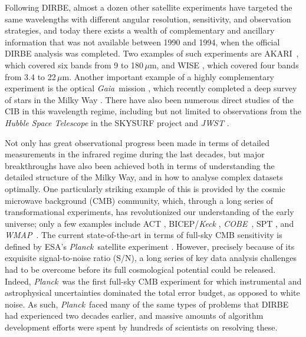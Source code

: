 \documentclass{aa}
\def\Planck{\textit{Planck}}
\def\WMAP{\textit{WMAP}}
\def\COBE{\textit{COBE}}
\def\GAIA{\textit{Gaia}}
\def\AKARI{\textrm{{AKARI}}}
\begin{document}
Following DIRBE, almost a dozen other satellite experiments have targeted the same wavelengths with different angular resolution, sensitivity, and observation strategies, and today there exists a wealth of complementary and ancillary information that was not available between 1990 and 1994, when the official DIRBE analysis was completed. Two examples of such experiments are \AKARI\ \citep{murakami:2007}, which covered six bands from 9 to 180\,$\mu$m, and WISE \citep{wright:2010}, which covered four bands from 3.4 to 22\,$\mu$m. Another important example of a highly complementary experiment is the optical \GAIA\ mission \citep{gaia:2016}, which recently completed a deep survey of stars in the Milky Way \citep{gaia:2018}. {There have also been numerous direct studies of the CIB in this wavelength regime, including but not limited to observations from the \textit{Hubble Space Telescope} in the SKYSURF project \citep{2022AJ....164..141W,2022AJ....164..170C,obrien2025} and \textit{JWST} \citep{2023AJ....165...13W,2023PASP..135d8002R}.}


Not only has great observational progress been made in terms of detailed measurements in the infrared regime during the last decades, but major breakthroughs have also been achieved both in terms of understanding the detailed structure of the Milky Way, and in how to analyse complex datasets optimally. One particularly striking example of this is provided by the cosmic microwave background (CMB) community, which, through a long series of transformational experiments, has revolutionized our understanding of the early universe; only a few examples include ACT \citep{fowler:2007}, BICEP/\textit{Keck} \citep{2014ApJ...792...62B}, \COBE\ \citep{mather:1994}, SPT \citep{carlstrom:2011}, and \WMAP\ \citep{bennett2012}. The current state-of-the-art in terms of full-sky CMB sensitivity is defined by ESA's \Planck\ satellite experiment \citep{planck2016-l01}. However, precisely because of its exquisite signal-to-noise ratio (S/N), a long series of key data analysis challenges had to be overcome before its full cosmological potential could be released. Indeed, \Planck\ was the first full-sky CMB experiment for which instrumental and astrophysical uncertainties dominated the total error budget, as opposed to white noise. As such, \Planck\ faced many of the same types of problems that DIRBE had experienced two decades earlier, and massive amounts of algorithm development efforts were spent by hundreds of scientists on resolving these.
\end{document}
